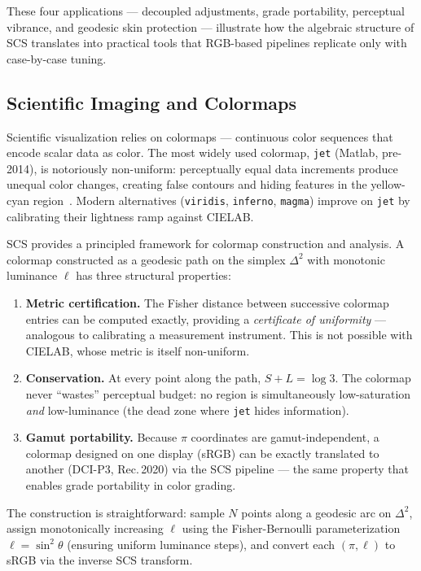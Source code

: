 \documentclass[12pt,a4paper]{article}
\begin{document}
\medskip

These four applications --- decoupled adjustments, grade portability,
perceptual vibrance, and geodesic skin protection --- illustrate how
the algebraic structure of SCS translates into practical tools that
RGB-based pipelines replicate only with case-by-case tuning.

\subsection{Scientific Imaging and Colormaps}

Scientific visualization relies on colormaps --- continuous color
sequences that encode scalar data as color. The most widely used
colormap, \texttt{jet} (Matlab, pre-2014), is notoriously
non-uniform: perceptually equal data increments produce unequal color
changes, creating false contours and hiding features in the
yellow-cyan region~\cite{borland2007}. Modern alternatives
(\texttt{viridis}, \texttt{inferno}, \texttt{magma}) improve on
\texttt{jet} by calibrating their lightness ramp against CIELAB.

SCS provides a principled framework for colormap construction and
analysis. A colormap constructed as a geodesic path on the simplex
$\Delta^2$ with monotonic luminance $\ell$ has three structural
properties:

\begin{enumerate}
\item \textbf{Metric certification.} The Fisher distance between
  successive colormap entries can be computed exactly, providing a
  \emph{certificate of uniformity} --- analogous to calibrating a
  measurement instrument. This is not possible with CIELAB, whose
  metric is itself non-uniform.

\item \textbf{Conservation.} At every point along the path,
  $S + L = \log 3$. The colormap never ``wastes'' perceptual budget:
  no region is simultaneously low-saturation \emph{and} low-luminance
  (the dead zone where \texttt{jet} hides information).

\item \textbf{Gamut portability.} Because $\pi$ coordinates are
  gamut-independent, a colormap designed on one display (sRGB) can
  be exactly translated to another (DCI-P3, Rec.\,2020) via the
  SCS pipeline --- the same property that enables grade portability
  in color grading.
\end{enumerate}

The construction is straightforward: sample $N$ points along a
geodesic arc on $\Delta^2$, assign monotonically increasing $\ell$
using the Fisher-Bernoulli parameterization $\ell = \sin^2\theta$
(ensuring uniform luminance steps), and convert each $(\pi, \ell)$ to
sRGB via the inverse SCS transform.
\end{document}
